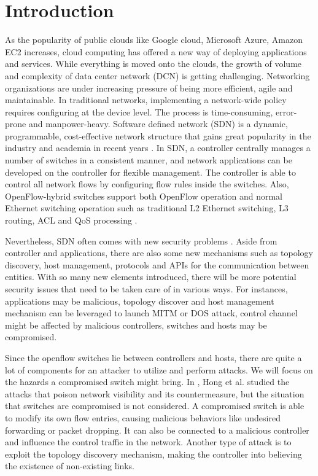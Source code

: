 \chapter{Introduction}
\label{chap:intro}
\setcounter{page}{1}

As the popularity of public clouds like Google cloud, Microsoft Azure, Amazon EC2 increases, cloud computing has offered a new way of deploying applications and services. While everything is moved onto the clouds, the growth of volume and complexity of data center network (DCN) is getting challenging. Networking organizations are under increasing pressure of being more efficient, agile and maintainable. In traditional networks, implementing a network-wide policy requires configuring at the device level. The process is time-consuming, error-prone and manpower-heavy. Software defined network (SDN) is a dynamic, programmable, cost-effective network structure that gains great popularity in the industry and academia in recent years \cite{KRVRAU15, MABPPRST08, LHM10}. In SDN, a controller centrally manages a number of switches in a consistent manner, and network applications can be developed on the controller for flexible management. The controller is able to control all network flows by configuring flow rules inside the switches. Also, OpenFlow-hybrid switches support both OpenFlow operation and normal Ethernet switching operation such as traditional L2 Ethernet switching, L3 routing, ACL and QoS processing \cite{OF_SPEC}.

Nevertheless, SDN often comes with new security problems \cite{SOS13, CM}. Aside from controller and applications, there are also some new mechanisms such as topology discovery, host management, protocols and APIs for the communication between entities. With so many new elements introduced, there will be more potential security issues that need to be taken care of in various ways. For instances, applications may be malicious, topology discover and host management mechanism can be leveraged to launch MITM or DOS attack, control channel might be affected by malicious controllers, switches and hosts may be compromised.

Since the openflow switches lie between controllers and hosts, there are quite a lot of components for an attacker to utilize and perform attacks. We will focus on the hazards a compromised switch might bring.
In \cite{HXWG15}, Hong et al. studied the attacks that poison network visibility and its countermeasure, but the situation that switches are compromised is not considered. A compromised switch is able to modify its own flow entries, causing malicious behaviors like undesired forwarding or packet dropping. It can also be connected to a malicious controller and influence the control traffic in the network. Another type of attack is to exploit the topology discovery mechanism, making the controller into believing the existence of non-existing links.

